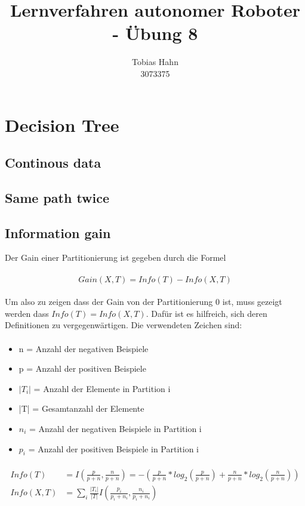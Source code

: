 \documentclass{article}
\title{Lernverfahren autonomer Roboter - Übung 8}
\author{Tobias Hahn\\ 3073375}
\begin{document}
\maketitle
\newpage
\section{Decision Tree}

\subsection{Continous data}

\subsection{Same path twice}

\subsection{Information gain}
Der Gain einer Partitionierung ist gegeben durch die Formel
\paragraph{}
\[
	Gain(X,T) = Info(T) - Info(X,T)
\]
\paragraph{}
Um also zu zeigen dass der Gain von der Partitionierung 0 ist, muss gezeigt werden dass $Info(T) = Info(X,T)$.
Dafür ist es hilfreich, sich deren Definitionen zu vergegenwärtigen. Die verwendeten Zeichen sind:
\paragraph{}
\begin{itemize}
	\item n = Anzahl der negativen Beispiele
	\item p = Anzahl der positiven Beispiele
	\item $|T_i|$ = Anzahl der Elemente in Partition i
	\item |T| = Gesamtanzahl der Elemente
	\item $n_i$ = Anzahl der negativen Beispiele in Partition i
	\item $p_i$ = Anzahl der positiven Beispiele in Partition i
\end{itemize}
\paragraph{}
\begin{align*}
	Info(T) &= I(\frac{p}{p+n},\frac{n}{p+n}) = -(\frac{p}{p+n} * log_2(\frac{p}{p+n}) + \frac{n}{p+n} * log_2(\frac{n}{p+n})) \\
	Info(X,T) &= \sum_i \frac{|T_i|}{|T|} I(\frac{p_i}{p_i+n_i},\frac{n_i}{p_i+n_i})
\end{align*}
\end{document}
